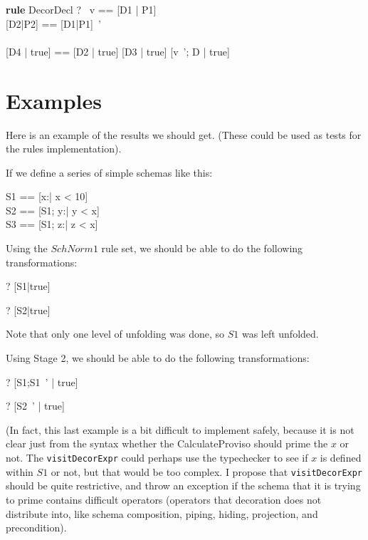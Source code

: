 \documentclass{article}
\newenvironment{zedrule}[1]{\par\textbf{rule }#1\vspace{-1ex}\infrule}{\endinfrule}
\newcommand{\derives}{\derive{}}
\newcommand{\proviso}{\raisebox{0.5ex}{${}_{\blacktriangleright}\ $}}%
\newcommand{\schemamerge}{\mathbin{\textbf{schemamerge}}}
\begin{document}
\begin{zedrule}{DecorDecl}
   \proviso ?~ v == [D1 | P1] \\
   \proviso [D2|P2] == [D1|P1]~' \\
   [D | true] \unfoldsTo [D3 | P3] \\
   \proviso [D4 | true] == [D2 | true] \schemamerge [D3 | true]
\derives
   [v~'; D | true] \unfoldsTo [D4 | P2 \land P3]
\end{zedrule}



\section*{Examples}
Here is an example of the results we should get.
(These could be used as tests for the rules implementation).

If we define a series of simple schemas like this:

\begin{zed}
  S1 == [x:\nat | x < 10] \\
  S2 == [S1; y:\nat | y < x] \\
  S3 == [S1; z:\nat | z < x]
\end{zed}

Using the $SchNorm1$ rule set, we should be able to
do the following transformations:

\begin{zed}
\vdash? [S1|true] 
\end{zed}
\begin{zed}
\vdash? [S2|true] 
\end{zed}

Note that only one level of unfolding was done, so $S1$ was left unfolded.

Using Stage 2, we should be able to
do the following transformations:

\begin{zed}
\vdash? [S1;S1~' | true] 
\end{zed}
\begin{zed}
\vdash? [S2~' | true] 
\end{zed}

(In fact, this last example is a bit difficult to implement safely,
because it is not clear just from the syntax whether the CalculateProviso
should prime the $x$ or not.  The \verb!visitDecorExpr! could perhaps
use the typechecker to see if $x$ is defined within $S1$ or not, but
that would be too complex.  I propose that \verb!visitDecorExpr! should
be quite restrictive, and throw an exception if the schema that it
is trying to prime contains difficult operators (operators that
decoration does not distribute into, like schema composition,
piping, hiding, projection, and precondition).
\end{document}
